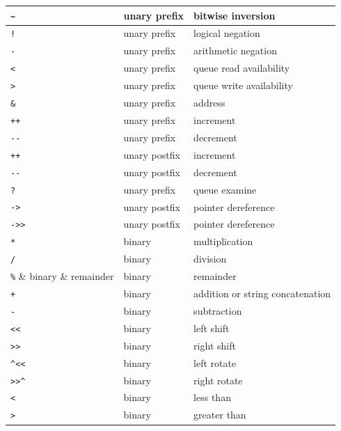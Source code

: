        \begin{tabular}{| l | l | l |}
        \hline
        \verb'~' & unary prefix & bitwise inversion \\
        \hline
        \verb'!' & unary prefix & logical negation \\
        \hline
        \verb'-' & unary prefix & arithmetic negation \\
        \hline
        \verb'<' & unary prefix & queue read availability \\
        \hline
        \verb'>' & unary prefix & queue write availability \\
        \hline
        \verb'&' & unary prefix & address \\
        \hline
        \verb'++' & unary prefix & increment \\
        \hline
        \verb'--' & unary prefix & decrement \\
        \hline
        \verb'++' & unary postfix & increment \\
        \hline
        \verb'--' & unary postfix & decrement \\
        \hline
        \verb'?' & unary prefix & queue examine \\
        \hline
        \verb'->' & unary postfix & pointer dereference \\
        \hline
        \verb'->>' & unary postfix & pointer dereference \\
        \hline
        \verb'*' & binary & multiplication \\
        \hline
        \verb'/' & binary & division \\
        \hline
        \verb'%' & binary & remainder \\
        \hline
        \verb'+' & binary & addition or string concatenation\\
        \hline
        \verb'-' & binary & subtraction \\
        \hline
        \verb'<<' & binary & left shift \\
        \hline
        \verb'>>' & binary & right shift \\
        \hline
        \verb'^<<' & binary & left rotate \\
        \hline
        \verb'>>^' & binary & right rotate \\
        \hline
        \verb'<' & binary & less than  \\
        \hline
        \verb'>' & binary & greater than \\
        \hline

\end{tabular}
